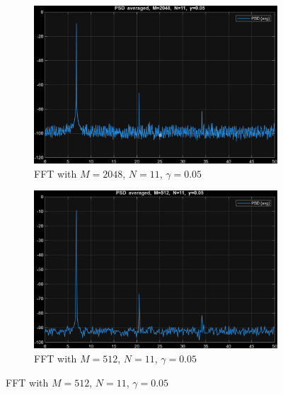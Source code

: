 \begin{figure}[H]
  \begin{subfigure}[t]{0.45\textwidth}
    \centering
    \includegraphics[width=\linewidth,height=0.28\textheight,keepaspectratio]{img/task5_5_2.png}
    \caption{FFT with $M=2048$, $N=11$, $\gamma=0.05$}
  \end{subfigure}\hfill
  \begin{subfigure}[t]{0.45\textwidth}
    \centering
    \includegraphics[width=\linewidth,height=0.28\textheight,keepaspectratio]{img/task5_5_5.png}
    \caption{FFT with $M=512$, $N=11$, $\gamma=0.05$}
  \end{subfigure}

  \vspace{1ex}


\end{figure}
